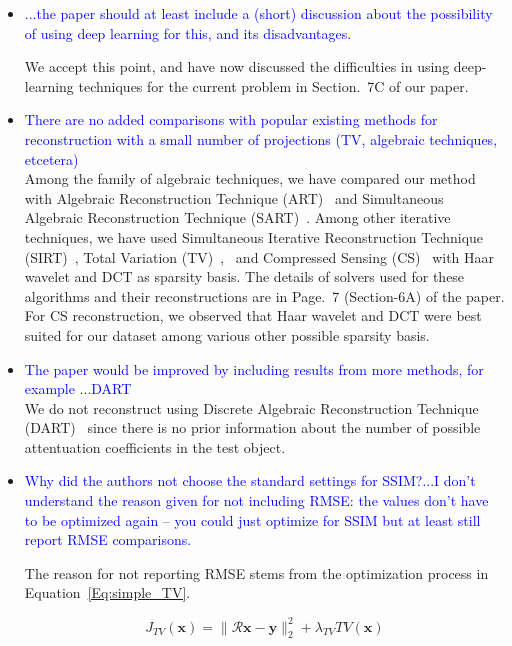 \documentclass{article}
\begin{document}
 \begin{itemize}
 \item    \textcolor{blue}{...the paper should at least include a (short) discussion about the
     possibility of using deep learning for this, and its disadvantages.}

   We accept this point, and have now discussed the difficulties in
   using deep-learning techniques for the current problem in Section.~7C
   of our paper. 

\item \textcolor{blue}{There are no added comparisons with popular existing methods for
  reconstruction with a small number of projections (TV, algebraic techniques, etcetera)}\\
  
 Among the family of algebraic techniques, we have compared our method
 with Algebraic Reconstruction Technique (ART)~\cite{art} and Simultaneous
 Algebraic Reconstruction Technique (SART)~\cite{sart}. 
 Among other iterative techniques, we
 have used Simultaneous Iterative Reconstruction Technique (SIRT)~\cite{sirt},
 Total Variation (TV)~\cite{TV},~\cite{TVReg} and Compressed Sensing (CS)~\cite{lasso} with Haar wavelet
 and DCT as sparsity basis. The details of solvers used for these
 algorithms and their reconstructions are in Page.~7 (Section-6A) of
 the paper. For CS reconstruction, we observed that Haar wavelet and
 DCT were best suited for our dataset among various other possible
 sparsity basis.

 \item \textcolor{blue}{The paper would be improved by including results from more methods, for example ...DART}\\
   We do not reconstruct
 using Discrete Algebraic Reconstruction Technique (DART)~\cite{dart} since there
 is no prior information about the number of possible attentuation
 coefficients in the test object.

\item \textcolor{blue}{Why did the authors not choose the standard
  settings for SSIM?...I don’t understand the reason given for not
  including RMSE: the values don’t have to be optimized again -- you
  could just optimize for SSIM but at least still report RMSE
  comparisons.}

  The reason for not reporting RMSE stems from the optimization
  process in Equation~\ref{Eq:simple_TV}.
  
 \begin{equation}
   J_{TV}(\boldsymbol{x}) = \lVert\boldsymbol{\mathcal{R}x}- \boldsymbol{y}\rVert_2^2 + \lambda_{TV}TV(\boldsymbol{x})
   \label{Eq:simple_TV}
 \end{equation}


\end{itemize}
\end{document}
